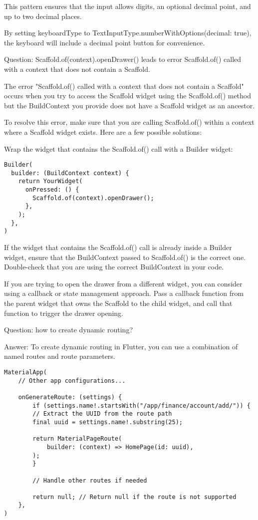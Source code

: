 This pattern ensures that the input allows digits, an optional decimal point, and up to two decimal places.

By setting keyboardType to TextInputType.numberWithOptions(decimal: true), the keyboard will include a 
decimal point button for convenience.

Question: Scaffold.of(context).openDrawer() leads to error Scaffold.of() called with a context that does 
not contain a Scaffold.

The error "Scaffold.of() called with a context that does not contain a Scaffold" occurs when you try to access 
the Scaffold widget using the Scaffold.of() method but the BuildContext you provide does not have a Scaffold 
widget as an ancestor.

To resolve this error, make sure that you are calling Scaffold.of() within a context where a Scaffold widget 
exists. Here are a few possible solutions:

Wrap the widget that contains the Scaffold.of() call with a Builder widget:

\begin{lstlisting}
Builder(
  builder: (BuildContext context) {
    return YourWidget(
      onPressed: () {
        Scaffold.of(context).openDrawer();
      },
    );
  },
)
\end{lstlisting}

If the widget that contains the Scaffold.of() call is already inside a Builder widget, ensure that the BuildContext 
passed to Scaffold.of() is the correct one. Double-check that you are using the correct BuildContext in your code.

If you are trying to open the drawer from a different widget, you can consider using a callback or state management 
approach. Pass a callback function from the parent widget that owns the Scaffold to the child widget, and call that 
function to trigger the drawer opening.


Question: how to create dynamic routing?

Answer: To create dynamic routing in Flutter, you can use a combination of named routes and route parameters. 

\begin{lstlisting}
MaterialApp(
    // Other app configurations...
    
    onGenerateRoute: (settings) {
        if (settings.name!.startsWith("/app/finance/account/add/")) {
        // Extract the UUID from the route path
        final uuid = settings.name!.substring(25);
    
        return MaterialPageRoute(
            builder: (context) => HomePage(id: uuid),
        );
        }
    
        // Handle other routes if needed
    
        return null; // Return null if the route is not supported
    },
)     
\end{lstlisting}

